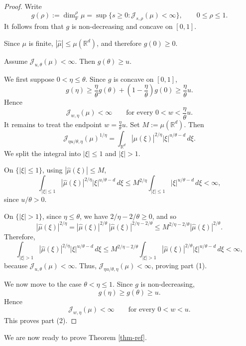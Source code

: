 \documentclass[11pt]{amsart}
\numberwithin{equation}{section}
\renewcommand{\ge}{\geqslant}
\renewcommand{\le}{\leqslant}
\newcommand{\J}{\mathcal{J}}
\theoremstyle{plain}
\theoremstyle{remark}
\begin{document}
\begin{proof}
Write
\[
g(\rho):=\dim_\mathrm{F}^\rho \mu
=
\sup\{s\ge 0:\J_{s,\rho}(\mu)<\infty\},
\qquad 0\le \rho\le 1.
\]
It follows from \cite[Theorems 1.1 and 1.3]{JMF} that $g$ is non-decreasing and concave on $[0, 1]$. 

Since \(\mu\) is finite, \(|\widehat{\mu}|\le \mu(\mathbb R^d)\), and therefore \(g(0)\ge 0\).

Assume \(\J_{u,\theta}(\mu)<\infty\). Then \(g(\theta)\ge u\).

We first suppose \(0<\eta\le \theta\). Since \(g\) is concave on \([0,1]\),
\[
g(\eta)\ge \frac{\eta}{\theta}g(\theta)+\left(1-\frac{\eta}{\theta}\right)g(0)
\ge \frac{\eta}{\theta}u.
\]
Hence
\[
\J_{w,\eta}(\mu)<\infty
\qquad \text{for every }0<w<\frac{\eta}{\theta}u.
\]
It remains to treat the endpoint \(w=\frac{\eta}{\theta}u\). Set \(M:=\mu(\mathbb R^d)\). Then
\[
\J_{\eta u/\theta,\eta}(\mu)^{1/\eta}
=
\int_{\mathbb R^d} |\widehat{\mu}(\xi)|^{2/\eta} |\xi|^{u/\theta-d}\,d\xi.
\]
We split the integral into \(|\xi|\le 1\) and \(|\xi|>1\).

On \(\{|\xi|\le 1\}\), using \(|\widehat{\mu}(\xi)|\le M\),
\[
\int_{|\xi|\le 1} |\widehat{\mu}(\xi)|^{2/\eta} |\xi|^{u/\theta-d}\,d\xi
\le
M^{2/\eta}\int_{|\xi|\le 1} |\xi|^{u/\theta-d}\,d\xi<\infty,
\]
since \(u/\theta>0\).

On \(\{|\xi|>1\}\), since \(\eta\le \theta\), we have \(2/\eta-2/\theta\ge 0\), and so
\[
|\widehat{\mu}(\xi)|^{2/\eta}
=
|\widehat{\mu}(\xi)|^{2/\theta}\,
|\widehat{\mu}(\xi)|^{2/\eta-2/\theta}
\le
M^{2/\eta-2/\theta}|\widehat{\mu}(\xi)|^{2/\theta}.
\]
Therefore,
\[
\int_{|\xi|>1} |\widehat{\mu}(\xi)|^{2/\eta} |\xi|^{u/\theta-d}\,d\xi
\le
M^{2/\eta-2/\theta}
\int_{|\xi|>1} |\widehat{\mu}(\xi)|^{2/\theta} |\xi|^{u/\theta-d}\,d\xi
<\infty,
\]
because \(\J_{u,\theta}(\mu)<\infty\). Thus, \(\J_{\eta u/\theta,\eta}(\mu)<\infty\), proving part (1).

We now move to the case \(\theta<\eta\le 1\). Since \(g\) is non-decreasing,
\[
g(\eta)\ge g(\theta)\ge u.
\]
Hence
\[
\J_{w,\eta}(\mu)<\infty
\qquad\text{for every }0<w<u.
\]
This proves part (2).
\end{proof}
We are now ready to prove Theorem \ref{thm-ref}.
\end{document}
